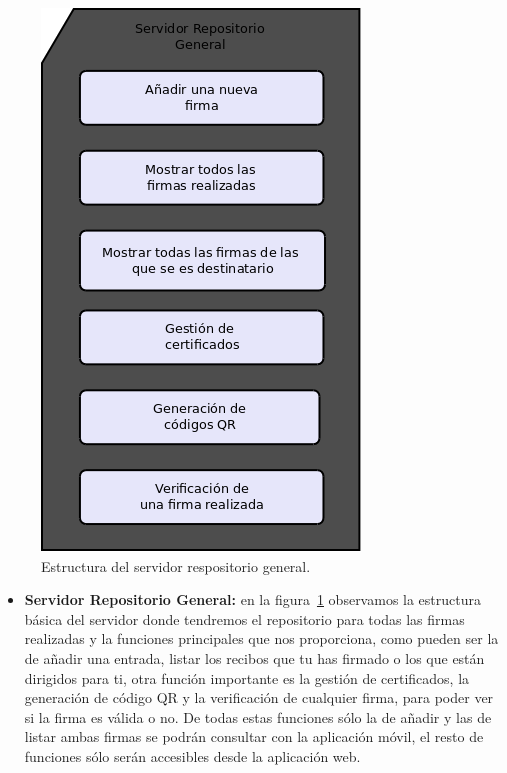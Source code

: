 \begin{figure}
  \centering
    \includegraphics[scale=0.3]{./DisenhoYArquitectura/imagenes/serverRepositorioGeneral.png}
  \caption{Estructura del servidor respositorio general.}
  \label{fig:serverRepositorioGeneral}
\end{figure}

\begin{itemize}
\item \textbf{Servidor Repositorio General:} en la figura~\ref{fig:serverRepositorioGeneral} observamos la estructura básica del servidor donde tendremos el repositorio para todas las firmas realizadas y la funciones principales que nos proporciona, como pueden ser la de añadir una entrada, listar los recibos que tu has firmado o los que están dirigidos para ti, otra función importante es la gestión de certificados, la generación de código QR y la verificación de cualquier firma, para poder ver si la firma es válida o no. De todas estas funciones sólo la de añadir y las de listar ambas firmas se podrán consultar con la aplicación móvil, el resto de funciones sólo serán accesibles desde la aplicación web.  
\end{itemize}


